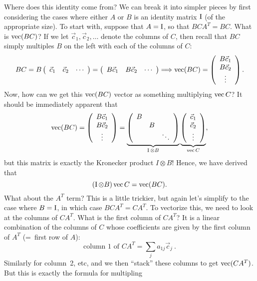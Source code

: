 Where does this identity come from? We can break it into simpler pieces by
first considering the cases where either $A$ or $B$ is an identity
matrix $\operatorname{I}$ (of the appropriate size). To start with, suppose that
$A=\operatorname{I}$, so that $BCA^{T}=BC$. What is $\operatorname{vec}(BC)$? If we let $\vec{c}_{1},\vec{c}_{2},\ldots$
denote the columns of $C$, then recall that $BC$ simply multiples
$B$ on the left with each of the columns of $C$: 
\[
BC=B\left(\begin{array}{ccc}
\vec{c}_{1} & \vec{c}_{2} & \cdots\end{array}\right)=\left(\begin{array}{ccc}
B\vec{c}_{1} & B\vec{c}_{2} & \cdots\end{array}\right)\Longrightarrow\operatorname{vec}(BC)=\left(\begin{array}{c}
B\vec{c}_{1}\\
B\vec{c}_{2}\\
\vdots
\end{array}\right).
\]
Now, how can we get this $\operatorname{vec}(BC)$ vector as something multiplying
$\operatorname{vec} C$? It should be immediately apparent that 
\[
\operatorname{vec}(BC)=\left(\begin{array}{c}
B\vec{c}_{1}\\
B\vec{c}_{2}\\
\vdots
\end{array}\right)=\underbrace{\left(\begin{array}{ccc}
B\\
 & B\\
 &  & \ddots
\end{array}\right)}_{\operatorname{I}\otimes B}\underbrace{\left(\begin{array}{c}
\vec{c}_{1}\\
\vec{c}_{2}\\
\vdots
\end{array}\right)}_{\operatorname{vec} C},
\]
but this matrix is exactly the Kronecker product $I\otimes B$! Hence,
we have derived that 
\[
(\operatorname{I}\otimes B)\operatorname{vec} C=\operatorname{vec}(BC).
\]
What about the $A^{T}$ term? This is a little trickier, but again
let's simplify to the case where $B=\operatorname{I}$, in which case $BCA^{T}=CA^{T}$.
To vectorize this, we need to look at the columns of $CA^{T}$. What
is the first column of $CA^{T}$? It is a linear combination of the
columns of $C$ whose coefficients are given by the first column of
$A^{T}$ (=~first row of $A$): 
\[
\text{column 1 of }CA^{T}=\sum_{j}a_{1j}\vec{c}_{j}\:.
\]
Similarly for column~2, etc, and we then ``stack'' these columns
to get $\operatorname{vec}(CA^{T})$. But this is exactly the formula for multipling
